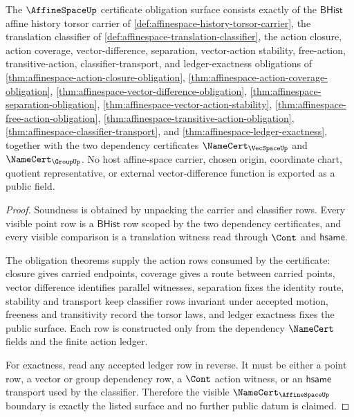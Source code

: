 \begin{theorem}
\label{thm:affinespace-namecert-obligation-surface}
The $\AffineSpaceUp$ certificate obligation surface consists exactly of the $\mathsf{BHist}$ affine history torsor carrier of \autoref{def:affinespace-history-torsor-carrier}, the translation classifier of \autoref{def:affinespace-translation-classifier}, the action closure, action coverage, vector-difference, separation, vector-action stability, free-action, transitive-action, classifier-transport, and ledger-exactness obligations of \autoref{thm:affinespace-action-closure-obligation}, \autoref{thm:affinespace-action-coverage-obligation}, \autoref{thm:affinespace-vector-difference-obligation}, \autoref{thm:affinespace-separation-obligation}, \autoref{thm:affinespace-vector-action-stability}, \autoref{thm:affinespace-free-action-obligation}, \autoref{thm:affinespace-transitive-action-obligation}, \autoref{thm:affinespace-classifier-transport}, and \autoref{thm:affinespace-ledger-exactness}, together with the two dependency certificates $\NameCert_{\VecSpaceUp}$ and $\NameCert_{\GroupUp}$. No host affine-space carrier, chosen origin, coordinate chart, quotient representative, or external vector-difference function is exported as a public field.
\end{theorem}
\begin{proof}
Soundness is obtained by unpacking the carrier and classifier rows. Every visible point row is a $\mathsf{BHist}$ row scoped by the two dependency certificates, and every visible comparison is a translation witness read through $\Cont$ and $\mathsf{hsame}$.

The obligation theorems supply the action rows consumed by the certificate: closure gives carried endpoints, coverage gives a route between carried points, vector difference identifies parallel witnesses, separation fixes the identity route, stability and transport keep classifier rows invariant under accepted motion, freeness and transitivity record the torsor laws, and ledger exactness fixes the public surface. Each row is constructed only from the dependency $\NameCert$ fields and the finite action ledger.

For exactness, read any accepted ledger row in reverse. It must be either a point row, a vector or group dependency row, a $\Cont$ action witness, or an $\mathsf{hsame}$ transport used by the classifier. Therefore the visible $\NameCert_{\AffineSpaceUp}$ boundary is exactly the listed surface and no further public datum is claimed.
\end{proof}

